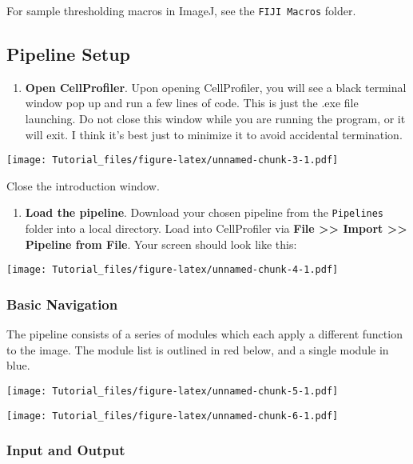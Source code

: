 \documentclass[
]{article}
\providecommand{\tightlist}{%
  \setlength{\itemsep}{0pt}\setlength{\parskip}{0pt}}
\begin{document}
For sample thresholding macros in ImageJ, see the \texttt{FIJI\ Macros}
folder.

\hypertarget{pipeline-setup}{%
\subsection{Pipeline Setup}\label{pipeline-setup}}

\begin{enumerate}
\def\labelenumi{\arabic{enumi}.}
\tightlist
\item
  \textbf{Open CellProfiler}. Upon opening CellProfiler, you will see a
  black terminal window pop up and run a few lines of code. This is just
  the .exe file launching. Do not close this window while you are
  running the program, or it will exit. I think it's best just to
  minimize it to avoid accidental termination.
\end{enumerate}

\texttt{[image: Tutorial\_files/figure-latex/unnamed-chunk-3-1.pdf]}

Close the introduction window.

\begin{enumerate}
\def\labelenumi{\arabic{enumi}.}
\setcounter{enumi}{1}
\tightlist
\item
  \textbf{Load the pipeline}. Download your chosen pipeline from the
  \texttt{Pipelines} folder into a local directory. Load into
  CellProfiler via \textbf{File \textgreater\textgreater{} Import
  \textgreater\textgreater{} Pipeline from File}. Your screen should
  look like this:
\end{enumerate}

\texttt{[image: Tutorial\_files/figure-latex/unnamed-chunk-4-1.pdf]}

\hypertarget{basic-navigation}{%
\subsubsection{Basic Navigation}\label{basic-navigation}}

The pipeline consists of a series of modules which each apply a
different function to the image. The module list is outlined in red
below, and a single module in blue.

\texttt{[image: Tutorial\_files/figure-latex/unnamed-chunk-5-1.pdf]}

\texttt{[image: Tutorial\_files/figure-latex/unnamed-chunk-6-1.pdf]}

\hypertarget{input-and-output}{%
\subsubsection{Input and Output}\label{input-and-output}}
\end{document}
